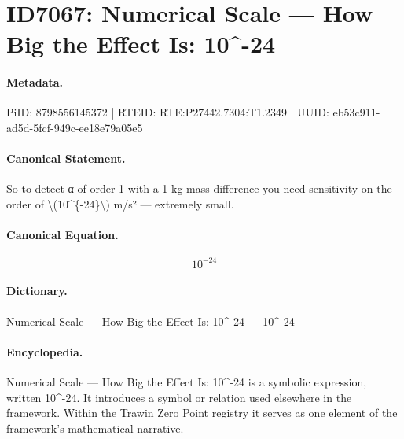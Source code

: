 \section*{ID7067: Numerical Scale — How Big the Effect Is: 10\textasciicircum{}-24}
\paragraph{Metadata.}
PiID: 8798556145372 | RTEID: RTE:P27442.7304:T1.2349 | UUID: eb53c911-ad5d-5fcf-949c-ee18e79a05e5

\paragraph{Canonical Statement.}
So to detect α of order 1 with a 1-kg mass difference you need sensitivity on the order of \textbackslash{}(10\textasciicircum{}\{-24\}\textbackslash{}) m/s² — extremely small.

\paragraph{Canonical Equation.}
\[
10^{-24}
\]

\paragraph{Dictionary.}
Numerical Scale — How Big the Effect Is: 10\textasciicircum{}-24 — 10\textasciicircum{}-24

\paragraph{Encyclopedia.}
Numerical Scale — How Big the Effect Is: 10\textasciicircum{}-24 is a symbolic expression, written 10\textasciicircum{}-24. It introduces a symbol or relation used elsewhere in the framework. Within the Trawin Zero Point registry it serves as one element of the framework's mathematical narrative.
